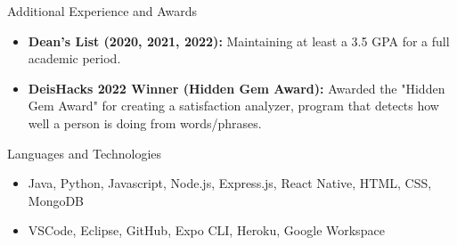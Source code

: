 \documentclass[]{mcdowellcv}
\begin{document}
	\begin{cvsection}{Additional Experience and Awards}
		\begin{cvsubsection}{}{}{}	
			\begin{itemize}
				\item \textbf{Dean's List (2020, 2021, 2022):} Maintaining at least a 3.5 GPA for a full academic period.
				\item \textbf{DeisHacks 2022 Winner (Hidden Gem Award):} Awarded the "Hidden Gem Award" for creating a satisfaction analyzer, program that detects how well a person is doing from words/phrases.
			\end{itemize}
		\end{cvsubsection}
	\end{cvsection}
	
	\begin{cvsection}{Languages and Technologies}
		\begin{cvsubsection}{}{}{}	
			\begin{itemize}
				\item Java, Python, Javascript, Node.js, Express.js, React Native, HTML, CSS, MongoDB
				\item VSCode, Eclipse, GitHub, Expo CLI, Heroku, Google Workspace
			\end{itemize}
		\end{cvsubsection}
	\end{cvsection}
	
\end{document}
